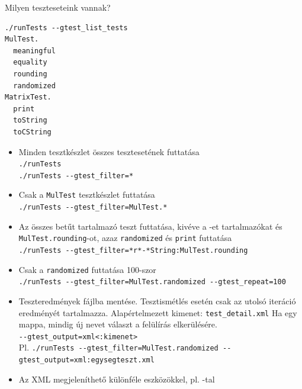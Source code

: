 \begin{frame}[fragile]
  \begin{block}{Milyen teszteseteink vannak?}
    \begin{verbatim}
./runTests --gtest_list_tests
MulTest.
  meaningful
  equality
  rounding
  randomized
MatrixTest.
  print
  toString
  toCString
\end{verbatim}
  \end{block}
\end{frame}

\begin{frame}
  \begin{itemize}
    \item Minden tesztkészlet összes tesztesetének futtatása \\ \texttt{./runTests} \\ \texttt{./runTests 
{-}-gtest\_filter=*}
    \item Csak a \texttt{MulTest} tesztkészlet futtatása \\ \texttt{./runTests {-}-gtest\_filter=MulTest.*}
    \item Az összes  betűt tartalmazó teszt futtatása, kivéve a -et tartalmazókat és 
\texttt{MulTest.rounding}-ot, azaz \texttt{randomized} és \texttt{print} futtatása \\ \texttt{./runTests 
{-}-gtest\_filter=*r*-*String:MulTest.rounding}
    \item Csak a \texttt{randomized} futtatása 100-szor \\ \texttt{./runTests {-}-gtest\_filter=MulTest.randomized 
{-}-gtest\_repeat=100}
  \end{itemize}
\end{frame}
  
\begin{frame}
  \begin{itemize}
    \item Teszteredmények fájlba mentése. Tesztismétlés esetén csak az utolsó iteráció eredményét tartalmazza. 
Alapértelmezett kimenet: \texttt{test\_detail.xml} Ha  egy mappa, mindig új nevet választ a felülírás 
elkerülésére. \\ \texttt{{-}-gtest\_output=xml<:kimenet>} \\ \scriptsize
    Pl. \texttt{./runTests {-}-gtest\_filter=MulTest.randomized {-}-gtest\_output=xml:egysegteszt.xml}
  \end{itemize}
  \begin{block}{}
  \end{block}
  \begin{itemize}
    \item Az XML megjeleníthető különféle eszközökkel, pl. %
-tal
  \end{itemize}
\end{frame}